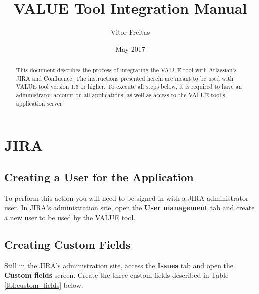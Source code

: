 \documentclass{article}
\title{VALUE Tool Integration Manual}
\author{Vitor Freitas}
\date{May 2017}
\begin{document}
\maketitle

\begin{abstract}
This document describes the process of integrating the VALUE tool with Atlassian's JIRA and Confluence. The instructions presented herein are meant to be used with VALUE tool version 1.5 or higher. To execute all steps below, it is required to have an administrator account on all applications, as well as access to the VALUE tool's application server.
\end{abstract}

\tableofcontents

\section{JIRA}
\label{jira}
\subsection{Creating a User for the Application}
\label{jira_app_user}

To perform this action you will need to be signed in with a JIRA administrator user. In JIRA's administration site, open the \textbf{User management} tab and create a new user to be used by the VALUE tool.


\subsection{Creating Custom Fields}
\label{jira_custom_fields}
Still in the JIRA's administration site, access the \textbf{Issues} tab and open the \textbf{Custom fields} screen. Create the three custom fields described in Table \ref{tbl:custom_fields} below.
\end{document}
